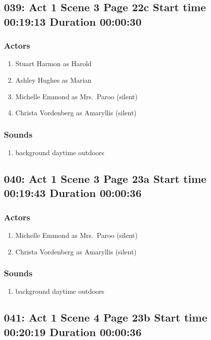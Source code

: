 \subsection{039: Act 1 Scene 3 Page 22c Start time 00:19:13 Duration 00:00:30}

\subsubsection{Actors}
\begin{enumerate}
\item Stuart Harmon as Harold
\item Ashley Hughes as Marian
\item Michelle Emmond as Mrs.~Paroo (silent)
\item Christa Vordenberg as Amaryllis (silent)
\end{enumerate}

\subsubsection{Sounds}
\begin{enumerate}
\item background daytime outdoors
\end{enumerate}
\subsection{040: Act 1 Scene 3 Page 23a Start time 00:19:43 Duration 00:00:36}

\subsubsection{Actors}
\begin{enumerate}
\item Michelle Emmond as Mrs.~Paroo (silent)
\item Christa Vordenberg as Amaryllis (silent)
\end{enumerate}

\subsubsection{Sounds}
\begin{enumerate}
\item background daytime outdoors
\end{enumerate}
\subsection{041: Act 1 Scene 4 Page 23b Start time 00:20:19 Duration 00:00:36}

